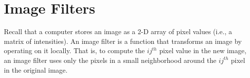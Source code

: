 \section*{Image Filters} %

Recall that a computer stores an image as a 2-D array of pixel values (i.e., a matrix of intensities).
An image filter is a function that transforms an image by operating on it locally.
That is, to compute the $ij^{th}$ pixel value in the new image, an image filter uses only the pixels in a small neighborhood around the $ij^{th}$ pixel in the original image.

